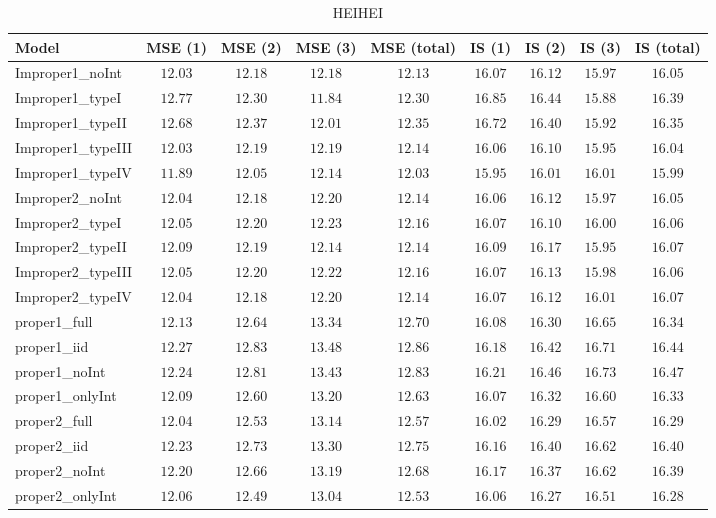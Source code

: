 \begin{table}

\caption{\label{tab:model-choice-sc6}HEIHEI}
\centering
\begin{tabular}{lcccccccc}
\hline
Model  & MSE (1) & MSE (2) & MSE (3) & MSE (total) & IS (1) & IS (2) & IS (3) & \multicolumn{1}{c}{IS (total)} \\ 
\hline
Improper1_noInt  & $12.03$ & $12.18$ & $12.18$ & $12.13$ & $16.07$ & $16.12$ & $15.97$ & $16.05$ \\
Improper1_typeI  & $12.77$ & $12.30$ & $11.84$ & $12.30$ & $16.85$ & $16.44$ & $15.88$ & $16.39$ \\
Improper1_typeII  & $12.68$ & $12.37$ & $12.01$ & $12.35$ & $16.72$ & $16.40$ & $15.92$ & $16.35$ \\
Improper1_typeIII  & $12.03$ & $12.19$ & $12.19$ & $12.14$ & $16.06$ & $16.10$ & $15.95$ & $16.04$ \\
Improper1_typeIV  & $11.89$ & $12.05$ & $12.14$ & $12.03$ & $15.95$ & $16.01$ & $16.01$ & $15.99$ \\
Improper2_noInt  & $12.04$ & $12.18$ & $12.20$ & $12.14$ & $16.06$ & $16.12$ & $15.97$ & $16.05$ \\
Improper2_typeI  & $12.05$ & $12.20$ & $12.23$ & $12.16$ & $16.07$ & $16.10$ & $16.00$ & $16.06$ \\
Improper2_typeII  & $12.09$ & $12.19$ & $12.14$ & $12.14$ & $16.09$ & $16.17$ & $15.95$ & $16.07$ \\
Improper2_typeIII  & $12.05$ & $12.20$ & $12.22$ & $12.16$ & $16.07$ & $16.13$ & $15.98$ & $16.06$ \\
Improper2_typeIV  & $12.04$ & $12.18$ & $12.20$ & $12.14$ & $16.07$ & $16.12$ & $16.01$ & $16.07$ \\
proper1_full  & $12.13$ & $12.64$ & $13.34$ & $12.70$ & $16.08$ & $16.30$ & $16.65$ & $16.34$ \\
proper1_iid  & $12.27$ & $12.83$ & $13.48$ & $12.86$ & $16.18$ & $16.42$ & $16.71$ & $16.44$ \\
proper1_noInt  & $12.24$ & $12.81$ & $13.43$ & $12.83$ & $16.21$ & $16.46$ & $16.73$ & $16.47$ \\
proper1_onlyInt  & $12.09$ & $12.60$ & $13.20$ & $12.63$ & $16.07$ & $16.32$ & $16.60$ & $16.33$ \\
proper2_full  & $12.04$ & $12.53$ & $13.14$ & $12.57$ & $16.02$ & $16.29$ & $16.57$ & $16.29$ \\
proper2_iid  & $12.23$ & $12.73$ & $13.30$ & $12.75$ & $16.16$ & $16.40$ & $16.62$ & $16.40$ \\
proper2_noInt  & $12.20$ & $12.66$ & $13.19$ & $12.68$ & $16.17$ & $16.37$ & $16.62$ & $16.39$ \\
proper2_onlyInt  & $12.06$ & $12.49$ & $13.04$ & $12.53$ & $16.06$ & $16.27$ & $16.51$ & $16.28$ \\
\hline 
\end{tabular}


\end{table}